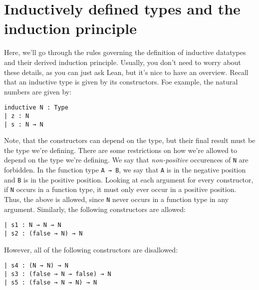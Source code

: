\documentclass[a4paper, 12pt]{article}
\newcommand{\lean}[1]{\texttt{#1}}
\theoremstyle{changedot}
\theoremstyle{changedotbreak}
\theoremstyle{nonumberplain}
\begin{document}
\printbibliography


\appendix
\section{Inductively defined types and the induction principle}\label{sec:ind}
Here, we'll go through the rules governing the definition of inductive datatypes and their derived induction principle. Usually, you don't need to worry about these details, as you can just ask Lean, but it's nice to have an overview. Recall that an inductive type is given by its constructors. Foe example, the natural numbers are given by:

\begin{verbatim}
inductive N : Type
| z : N
| s : N → N 
\end{verbatim}

Note, that the constructors can depend on the type, but their final result must be the type we're defining. There are some restrictions on how we're allowed to depend on the type we're defining. We say that \textit{non-positive} occurences of \lean{N} are forbidden. In the function type \lean{A → B}, we say that \lean{A} is in the negative position and \lean{B} is in the positive position. Looking at each argument for every constructor, if \lean{N} occurs in a function type, it must only ever occur in a positive position. Thus, the above is allowed, since \lean{N} never occurs in a function type in any argument. Similarly, the following constructors are allowed:
\begin{verbatim}
| s1 : N → N → N
| s2 : (false → N) → N
\end{verbatim}

However, all of the following constructors are disallowed:

\begin{verbatim}
| s4 : (N → N) → N
| s3 : (false → N → false) → N
| s5 : (false → N → N) → N
\end{verbatim}
\end{document}
